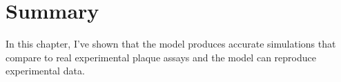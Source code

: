 \begin{figure}
\centering
\caption{ \label{fig_FitRuns}}
\end{figure}

\section{Summary}

In this chapter, I've shown that the model produces accurate simulations that compare to real experimental plaque assays and the model can reproduce experimental data.





